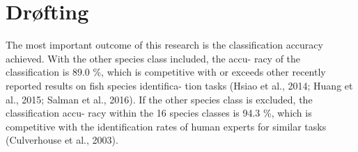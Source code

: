 




\section{Drøfting}

The most important outcome of this research is the classification accuracy achieved. With the other species class included, the accu- racy of the classification is 89.0 \%, which is competitive with or exceeds other recently reported results on fish species identifica- tion tasks (Hsiao et al., 2014; Huang et al., 2015; Salman et al., 2016). If the other species class is excluded, the classification accu- racy within the 16 species classes is 94.3 \%, which is competitive with the identification rates of human experts for similar tasks (Culverhouse et al., 2003).